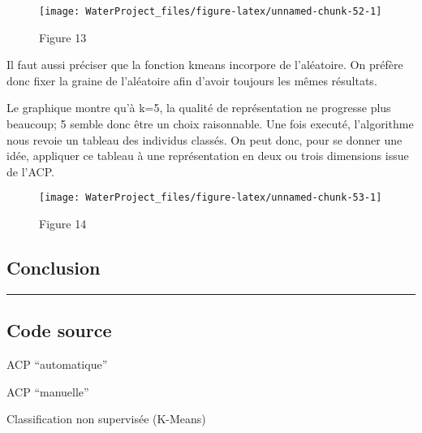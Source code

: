 \documentclass[]{article}
\begin{document}
\begin{figure}

{\centering \texttt{[image: WaterProject\_files/figure-latex/unnamed-chunk-52-1]} 

}

\caption{Figure 13}\label{fig:unnamed-chunk-52}
\end{figure}

Il faut aussi préciser que la fonction kmeans incorpore de l'aléatoire.
On préfère donc fixer la graine de l'aléatoire afin d'avoir toujours les
mêmes résultats.

Le graphique montre qu'à k=5, la qualité de représentation ne progresse
plus beaucoup; 5 semble donc être un choix raisonnable. Une fois
executé, l'algorithme nous revoie un tableau des individus classés. On
peut donc, pour se donner une idée, appliquer ce tableau à une
représentation en deux ou trois dimensions issue de l'ACP.

\begin{figure}

{\centering \texttt{[image: WaterProject\_files/figure-latex/unnamed-chunk-53-1]} 

}

\caption{Figure 14}\label{fig:unnamed-chunk-53}
\end{figure}

\hypertarget{conclusion}{\subsection{Conclusion}\label{conclusion}}

\begin{center}\rule{0.5\linewidth}{\linethickness}\end{center}

\hypertarget{code-source}{\subsection{Code source}\label{code-source}}

ACP ``automatique''

ACP ``manuelle''

Classification non supervisée (K-Means)
\end{document}
